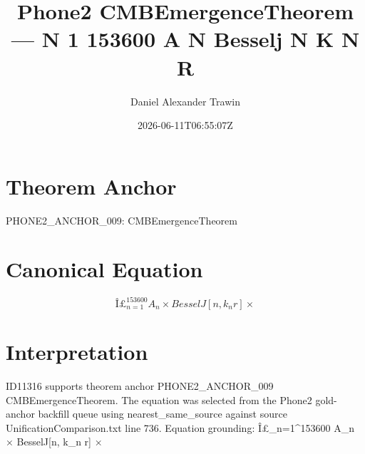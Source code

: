 \documentclass[11pt]{article}
\title{Phone2 CMBEmergenceTheorem — N 1 153600 A N Besselj N K N R}
\author{Daniel Alexander Trawin}
\date{2026-06-11T06:55:07Z}
\begin{document}
\maketitle
\section*{Theorem Anchor}
PHONE2_ANCHOR_009: CMBEmergenceTheorem
\section*{Canonical Equation}
\[
Î£_{n=1}^{153600} A_n × BesselJ[n, k_n r] ×
\]
\section*{Interpretation}
ID11316 supports theorem anchor PHONE2_ANCHOR_009 CMBEmergenceTheorem. The equation was selected from the Phone2 gold-anchor backfill queue using nearest_same_source against source UnificationComparison.txt line 736. Equation grounding: Î£_{n=1}^{153600} A_n × BesselJ[n, k_n r] ×
\end{document}

